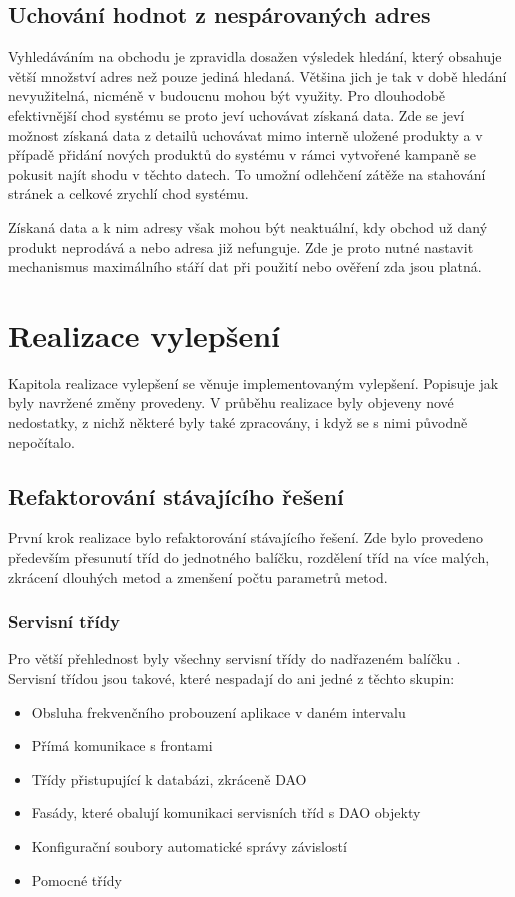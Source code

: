 \documentclass[thesis=B,czech]{FITthesis}[2012/06/26]
\begin{document}
\section{Uchování hodnot z nespárovaných adres}
Vyhledáváním na obchodu je zpravidla dosažen výsledek hledání, který obsahuje větší množství adres než pouze
jediná hledaná. Většina jich je tak v době hledání nevyužitelná, nicméně v budoucnu mohou být využity. Pro dlouhodobě 
efektivnější chod systému se proto jeví uchovávat získaná data. Zde se jeví možnost získaná data z detailů uchovávat mimo interně uložené produkty
a v případě přidání nových produktů do systému v rámci vytvořené kampaně se pokusit najít shodu v těchto datech. To umožní odlehčení zátěže
na stahování stránek a celkové zrychlí chod systému.
\par
Získaná data a k nim adresy však mohou být neaktuální, kdy obchod už daný produkt neprodává a nebo adresa již nefunguje. Zde je proto nutné
nastavit mechanismus maximálního stáří dat při použití nebo ověření zda jsou platná.


\chapter{Realizace vylepšení}
Kapitola realizace vylepšení se věnuje implementovaným vylepšení. Popisuje jak byly navržené změny provedeny.
V průběhu realizace byly objeveny nové nedostatky, z nichž některé byly také zpracovány, i když se s nimi původně nepočítalo.

\section{Refaktorování stávajícího řešení}
První krok realizace bylo refaktorování stávajícího řešení. Zde bylo provedeno především přesunutí tříd do jednotného balíčku, 
rozdělení tříd na více malých, zkrácení dlouhých metod a zmenšení počtu parametrů metod.

\subsection{Servisní třídy}
Pro větší přehlednost byly všechny servisní třídy do nadřazeném balíčku . 
Servisní třídou jsou takové, které nespadají do ani jedné z těchto skupin:

\begin{itemize}
\item Obsluha frekvenčního probouzení aplikace v daném intervalu
\item Přímá komunikace s frontami
\item Třídy přistupující k databázi, zkráceně DAO
\item Fasády, které obalují komunikaci servisních tříd s DAO objekty
\item Konfigurační soubory automatické správy závislostí
\item Pomocné třídy
\end{itemize}
\end{document}
